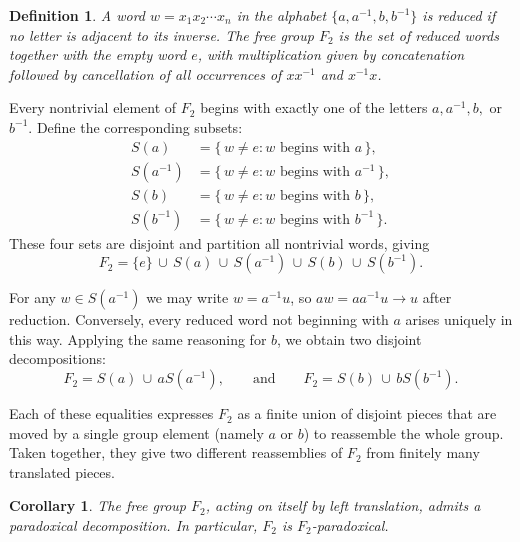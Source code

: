 \documentclass[12pt,a4paper]{article}
\theoremstyle{spaced}
\newtheorem{definition}{Definition}[section]
\newtheorem{corollary}{Corollary}[section]
\begin{document}
\begin{definition}
	A word \(w = x_1 x_2 \cdots x_n\) in the alphabet
	\(\{a, a^{-1}, b, b^{-1}\}\) is \emph{reduced} if no letter is adjacent to its
	inverse.
	The free group \(F_2\) is the set of reduced words together with the
	empty word \(e\), with multiplication given by concatenation followed by
	cancellation of all occurrences of \(x x^{-1}\) and \(x^{-1} x\).
\end{definition}

Every nontrivial element of \(F_2\) begins with exactly one of the letters
\(a, a^{-1}, b,\) or \(b^{-1}\).  Define the corresponding subsets:
\[
	\begin{aligned}
		S(a)      & = \{\, w \ne e : w \text{ begins with } a \,\},      \\
		S(a^{-1}) & = \{\, w \ne e : w \text{ begins with } a^{-1} \,\}, \\
		S(b)      & = \{\, w \ne e : w \text{ begins with } b \,\},      \\
		S(b^{-1}) & = \{\, w \ne e : w \text{ begins with } b^{-1} \,\}.
	\end{aligned}
\]
These four sets are disjoint and partition all nontrivial words, giving
\begin{equation}\label{eq:F2partition-clean}
	F_2 = \{e\} \,\cup\, S(a) \,\cup\, S(a^{-1}) \,\cup\, S(b) \,\cup\, S(b^{-1}).
\end{equation}

For any \(w \in S(a^{-1})\) we may write \(w = a^{-1} u\), so
\(
aw = aa^{-1} u \to u
\)
after reduction.
Conversely, every reduced word not beginning with \(a\) arises uniquely in this way.
Applying the same reasoning for \(b\), we obtain two disjoint decompositions:
\[
	F_2 = S(a) \,\cup\, a S(a^{-1}),
	\qquad\text{and}\qquad
	F_2 = S(b) \,\cup\, b S(b^{-1}).
\]

Each of these equalities expresses \(F_2\) as a finite union of disjoint pieces
that are moved by a single group element (namely \(a\) or \(b\)) to reassemble the
whole group.  Taken together, they give two different reassemblies of \(F_2\)
from finitely many translated pieces.

\begin{corollary}\label{cor:F2_paradoxical-clean}
	The free group \(F_2\), acting on itself by left translation, admits a paradoxical
	decomposition.  In particular, \(F_2\) is \(F_2\)-paradoxical.
\end{corollary}
\end{document}
